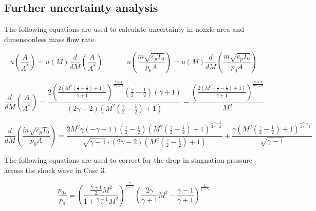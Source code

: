 \documentclass{article}
\begin{document}
\subsection{Further uncertainty analysis}

The following equations are used to calculate uncertainty in nozzle area and dimensionless mass flow rate.

\begin{equation}
    u\left( \frac{A}{A^*} \right) = u(M) \frac{d}{dM}\left( \frac{A}{A^*} \right) \;\;\;\;\;\;\;\;\;\;\;\; u\left( \frac{\dot{m}\sqrt{c_pT_0}}{p_0A} \right) = u(M) \frac{d}{dM}\left( \frac{\dot{m}\sqrt{c_pT_0}}{p_0A} \right)
\end{equation}

\begin{equation}
    \frac{d}{dM}\left( \frac{A}{A^*} \right) = \frac{2 \left(\frac{2 \left(M^{2} \left(\frac{\gamma}{2} - \frac{1}{2}\right) + 1\right)}{\gamma + 1}\right)^{\frac{\gamma + 1}{2 \gamma - 2}} \left(\frac{\gamma}{2} - \frac{1}{2}\right) \left(\gamma + 1\right)}{\left(2 \gamma - 2\right) \left(M^{2} \left(\frac{\gamma}{2} - \frac{1}{2}\right) + 1\right)} - \frac{\left(\frac{2 \left(M^{2} \left(\frac{\gamma}{2} - \frac{1}{2}\right) + 1\right)}{\gamma + 1}\right)^{\frac{\gamma + 1}{2 \gamma - 2}}}{M^{2}}
    \label{eqn:dA_dM}
\end{equation}

\begin{equation}
    \frac{d}{dM}\left( \frac{\dot{m}\sqrt{c_pT_0}}{p_0A} \right) = \frac{2 M^{2} \gamma \left(- \gamma - 1\right) \left(\frac{\gamma}{2} - \frac{1}{2}\right) \left(M^{2} \left(\frac{\gamma}{2} - \frac{1}{2}\right) + 1\right)^{\frac{- \gamma - 1}{2 \gamma - 2}}}{\sqrt{\gamma - 1} \cdot \left(2 \gamma - 2\right) \left(M^{2} \left(\frac{\gamma}{2} - \frac{1}{2}\right) + 1\right)} + \frac{\gamma \left(M^{2} \left(\frac{\gamma}{2} - \frac{1}{2}\right) + 1\right)^{\frac{- \gamma - 1}{2 \gamma - 2}}}{\sqrt{\gamma - 1}}
    \label{eqn:dmdot_dM}
\end{equation}

The following equations are used to correct for the drop in stagnation pressure across the shock wave in Case 3.

\begin{equation}
    \frac{p_{0s}}{p_0} = \left( \frac{\frac{\gamma+1}{2}M^2}{1 + \frac{\gamma-1}{2}M^2}\right) ^ \frac{\gamma}{\gamma-1} \left( \frac{2\gamma}{\gamma+1} M^2 - \frac{\gamma-1}{\gamma+1}\right) ^ \frac{1}{1 - \gamma}
\end{equation}
\end{document}
